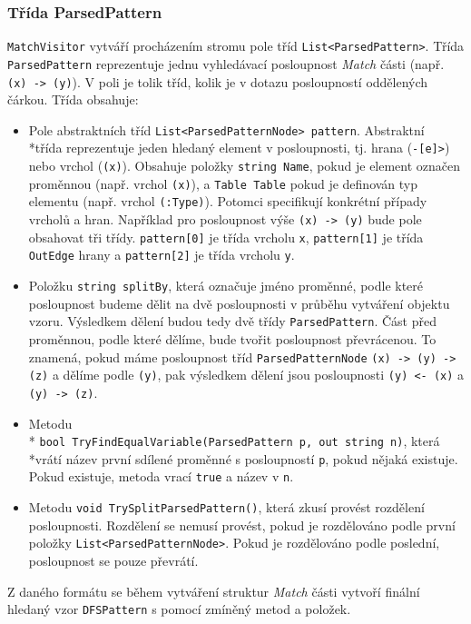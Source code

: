 \subsubsection{Třída ParsedPattern}

\texttt{MatchVisitor} vytváří procházením stromu pole tříd \texttt{List<ParsedPattern>}.
Třída \texttt{ParsedPattern} reprezentuje jednu vyhledávací posloupnost \textit{Match} části (např. \texttt{(x) -> (y)}).
V poli je tolik tříd, kolik je v dotazu posloupností oddělených čárkou.
Třída obsahuje:
\begin{itemize}
\item Pole abstraktních tříd \texttt{List<ParsedPatternNode> pattern}.
Abstraktní \\*třída reprezentuje jeden hledaný element v posloupnosti, tj. hrana  (\texttt{-[e]>}) nebo vrchol (\texttt{(x)}).
Obsahuje položky \texttt{string Name}, pokud je element označen proměnnou (např. vrchol \texttt{(x)}), a \texttt{Table Table} pokud je definován typ elementu (např. vrchol \texttt{(:Type)}).
Potomci specifikují konkrétní případy vrcholů a hran. 
Například pro posloupnost výše \texttt{(x) -> (y)} bude pole obsahovat tři třídy.
\texttt{pattern[0]} je třída vrcholu \texttt{x}, \texttt{pattern[1]} je třída \texttt{OutEdge} hrany a \texttt{pattern[2]} je třída vrcholu \texttt{y}.

\item Položku \texttt{string splitBy}, která označuje jméno proměnné, podle které posloupnost budeme dělit na dvě posloupnosti v průběhu vytváření objektu vzoru.
Výsledkem dělení budou tedy dvě třídy \texttt{ParsedPattern}.
Část před proměnnou, podle které dělíme, bude tvořit posloupnost převrácenou.
To znamená, pokud máme posloupnost tříd \texttt{ParsedPatternNode} \texttt{(x) -> (y) -> (z)} a dělíme podle \texttt{(y)}, pak výsledkem dělení jsou posloupnosti 
\texttt{(y) <- (x)} a \texttt{(y) -> (z)}.

\item Metodu\\* \texttt{bool TryFindEqualVariable(ParsedPattern p, out string n)}, která \\*vrátí název první sdílené proměnné s posloupností \texttt{p}, pokud nějaká existuje.
Pokud existuje, metoda vrací \texttt{true} a název v \texttt{n}.

\item Metodu \texttt{void TrySplitParsedPattern()}, která zkusí provést rozdělení posloupnosti.
Rozdělení se nemusí provést, pokud je rozdělováno podle první položky \texttt{List<ParsedPatternNode>}. 
Pokud je rozdělováno podle poslední, posloupnost se pouze převrátí.

\end{itemize}
Z daného formátu se během vytváření struktur \textit{Match} části vytvoří finální hledaný vzor \texttt{DFSPattern} s pomocí zmíněný metod a položek.

